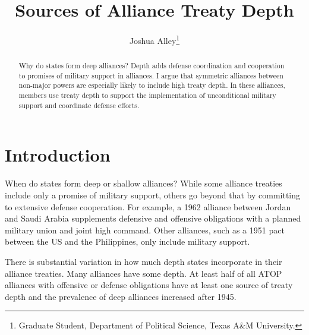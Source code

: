 \documentclass[12pt]{article}
\title{\textbf{Sources of Alliance Treaty Depth}}
\author{Joshua Alley\footnote{Graduate Student,
Department of Political Science, Texas A\&M University.}}
\date{}
\begin{document}
\maketitle 

\doublespace 

\begin{abstract}
Why do states form deep alliances? 
Depth adds defense coordination and cooperation to promises of military support in alliances.
I argue that symmetric alliances between non-major powers are especially likely to include high treaty depth. 
In these alliances, members use treaty depth to support the implementation of unconditional military support and coordinate defense efforts. 
\end{abstract}


\newpage 


\section{Introduction}


When do states form deep or shallow alliances? 
While some alliance treaties include only a promise of military support, others go beyond that by committing to extensive defense cooperation. 
For example, a 1962 alliance between Jordan and Saudi Arabia supplements defensive and offensive obligations with a planned military union and joint high command. 
Other alliances, such as a 1951 pact between the US and the Philippines, only include military support. 


There is substantial variation in how much depth states incorporate in their alliance treaties. 
Many alliances have some depth. 
At least half of all ATOP alliances with offensive or defense obligations have at least one source of treaty depth and the prevalence of deep alliances increased after 1945. 
\end{document}
